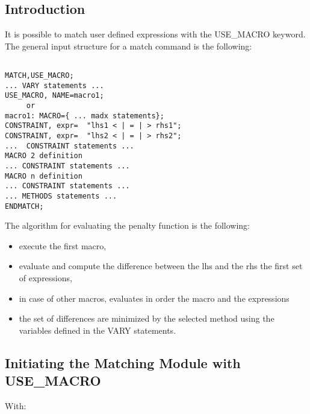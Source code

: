 






\subsection{
   Introduction }
 It is possible to match user defined expressions with the USE\_MACRO keyword.
 The general input structure for a match command is the following:
\\
\begin{verbatim}

MATCH,USE_MACRO;
... VARY statements ...
USE_MACRO, NAME=macro1;
     or
macro1: MACRO={ ... madx statements};
CONSTRAINT, expr=  "lhs1 < | = | > rhs1";
CONSTRAINT, expr=  "lhs2 < | = | > rhs2";
...  CONSTRAINT statements ...
MACRO 2 definition
... CONSTRAINT statements ...
MACRO n definition
... CONSTRAINT statements ...
... METHODS statements ...
ENDMATCH;
\end{verbatim}
 
 The algorithm for evaluating the penalty function is the following:
 
\begin{itemize}
	\item  execute the first macro,
	\item  evaluate and compute the difference between the lhs and the rhs the first set of expressions,
	\item in case of other macros, evaluates in order the macro and the expressions
	\item  the set of differences are  minimized by the selected method using the variables defined in the VARY statements.
\end{itemize}

\subsection{\href{match}{}Initiating the Matching Module with USE\_MACRO}
 With:
 

